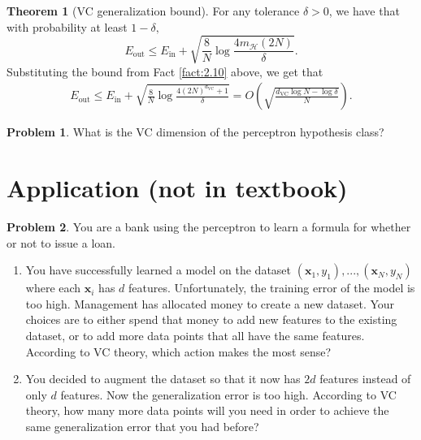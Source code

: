 \documentclass[10pt]{exam}
\theoremstyle{definition}
\newtheorem{problem}{Problem}
\newtheorem{theorem}{Theorem}
\newcommand{\R}{\mathbb R}
\DeclareMathOperator{\sign}{sign}
\newcommand{\Ein}{E_{\text{in}}}
\newcommand{\Eout}{E_{\text{out}}}
\newcommand{\x}{\mathbf x}
\newcommand{\mH}{m_{\mathcal H}}
\newcommand{\dvc}{{d_{\text{VC}}}}
\newcommand{\HH}[1]{\mathcal H_{\text{#1}}}
\begin{document}
\newpage
\begin{theorem}[VC generalization bound]
    For any tolerance $\delta>0$, we have that with probability at least $1-\delta,$
    \begin{equation}
        \Eout \le \Ein + \sqrt{\frac8N \log\frac{4\mH(2N)}{\delta}}.
    \end{equation}
    Substituting the bound from Fact \ref{fact:2.10} above,
    we get that
    \begin{align}
        \Eout 
        \le \Ein + \sqrt{\frac8N \log\frac{4(2N)^\dvc + 1}{\delta}} 
        = O\left(\sqrt{\frac{\dvc\log N - \log\delta}{N}}\right).
    \end{align}

\end{theorem}

\newpage
\begin{problem}
    What is the VC dimension of the perceptron hypothesis class?
\end{problem}

\newpage
\section*{Application (not in textbook)}
\begin{problem}
    You are a bank using the perceptron to learn a formula for whether or not to issue a loan.
    \begin{enumerate}
        \item
            You have successfully learned a model on the dataset $(\x_1,y_1), ..., (\x_N,y_N)$ where each $\x_i$ has $d$ features.
            Unfortunately, the training error of the model is too high.
            Management has allocated money to create a new dataset.
            Your choices are to either spend that money to add new features to the existing dataset,
            or to add more data points that all have the same features.
            According to VC theory, which action makes the most sense?

            \vspace{4in}
        \item
            You decided to augment the dataset so that it now has $2d$ features instead of only $d$ features.
            Now the generalization error is too high.
            According to VC theory, how many more data points will you need in order to achieve the same generalization error that you had before?
    \end{enumerate}
\end{problem}

%
%
%
\end{document}
